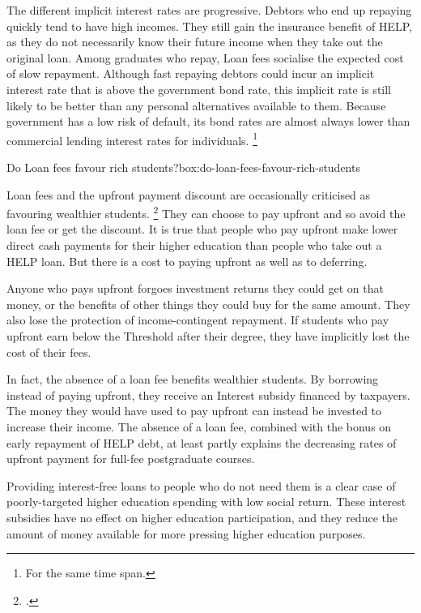 \documentclass{grattan}
\begin{document}
The different implicit interest rates are progressive.
Debtors who end up repaying quickly tend to have high incomes.
They still gain the insurance benefit of \gls{HELP}, as they do not necessarily know their future income when they take out the original loan.
Among graduates who repay, \gls{Loan fees} socialise the expected cost of slow repayment.
Although fast repaying debtors could incur an implicit interest rate that is above the government bond rate, this implicit rate is still likely to be better than any personal alternatives available to them.
Because government has a low risk of default, its bond rates are almost always lower than commercial lending interest rates for individuals.%
\CenturyFootnote\footnote{For the same time span.}

\begin{smallbox}{Do \gls{Loan fees} favour rich students?}{box:do-loan-fees-favour-rich-students}

\Gls{Loan fees} and the upfront payment discount are occasionally criticised as favouring wealthier students.%
\footcites{Hare-2015-loan-fees-advantage-the-rich}{Evans2011MediareleaseGillard} %
They can choose to pay upfront and so avoid the loan fee or get the discount.
It is true that people who pay upfront make lower direct cash payments for their higher education than people who take out a \gls{HELP} loan.
But there is a cost to paying upfront as well as to deferring.

Anyone who pays upfront forgoes investment returns they could get on that money, or the benefits of other things they could buy for the same amount.
They also lose the protection of income-contingent repayment.
If students who pay upfront earn below the \gls{Threshold} after their degree, they have implicitly lost the cost of their fees.

In fact, the absence of a loan fee benefits wealthier students.
By borrowing instead of paying upfront, they receive an \gls{Interest subsidy} financed by taxpayers.
The money they would have used to pay upfront can instead be invested to increase their income.
The absence of a loan fee, combined with the bonus on early repayment of \gls{HELP} debt, at least partly explains the decreasing rates of upfront payment for full-fee postgraduate courses.

Providing interest-free loans to people who do not need them is a clear case of poorly-targeted higher education spending with low social return.
These interest subsidies have no effect on higher education participation, and they reduce the amount of money available for more pressing higher education purposes.
\end{smallbox}
\end{document}

